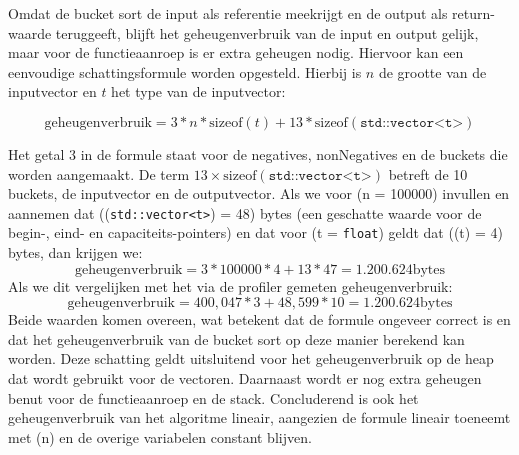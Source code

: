 \documentclass{article}
\begin{document}
Omdat de bucket sort de input als referentie meekrijgt en de output als return-waarde teruggeeft, 
blijft het geheugenverbruik van de input en output gelijk, maar voor de functieaanroep is er extra geheugen nodig. 
Hiervoor kan een eenvoudige schattingsformule worden opgesteld. 
Hierbij is $n$ de grootte van de inputvector en $t$ het type van de inputvector:

\begin{equation}
  \text{geheugenverbruik} = 3 * n * \text{sizeof}(t) + 13 * \text{sizeof}(\texttt{std::vector<t>})
\end{equation}

Het getal 3 in de formule staat voor de negatives, nonNegatives en de buckets die worden aangemaakt. 
De term $13 \times \text{sizeof}(\texttt{std::vector<t>})$ betreft de 10 buckets, de inputvector en de outputvector. 
Als we voor (n = 100000) invullen en aannemen dat ((\texttt{std::vector<t>}) = 48) bytes 
(een geschatte waarde voor de begin-, eind- en capaciteits-pointers) en dat voor (t = \texttt{float}) geldt dat ((t) = 4) bytes, dan krijgen we:
\begin{equation}
  \text{geheugenverbruik} = 3 * 100000 * 4 + 13 * 47 = 1.200.624 \text{bytes}
\end{equation}
Als we dit vergelijken met het via de profiler gemeten geheugenverbruik:
\begin{equation}
  \text{geheugenverbruik} = 400,047 * 3 + 48,599 * 10 = 1.200.624 \text{bytes}
\end{equation}
Beide waarden komen overeen, wat betekent dat de formule ongeveer correct is en dat het geheugenverbruik van de bucket sort op deze manier berekend kan worden. 
Deze schatting geldt uitsluitend voor het geheugenverbruik op de heap dat wordt gebruikt voor de vectoren. 
Daarnaast wordt er nog extra geheugen benut voor de functieaanroep en de stack. 
Concluderend is ook het geheugenverbruik van het algoritme lineair, 
aangezien de formule lineair toeneemt met (n) en de overige variabelen constant blijven.
\end{document}
